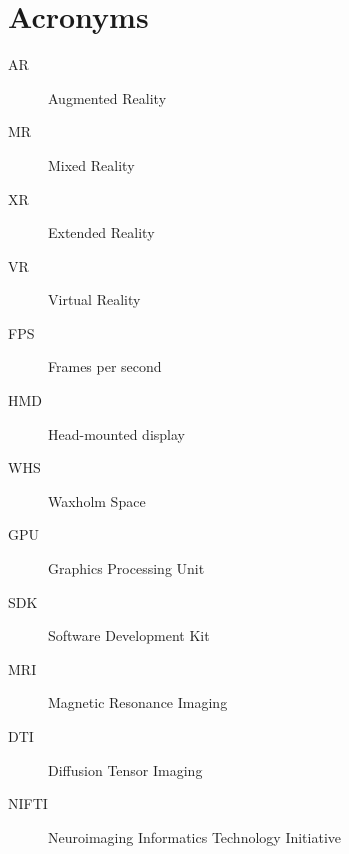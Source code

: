 
\chapter{Acronyms}
\begin{description}
\item[AR] Augmented Reality
\item[MR] Mixed Reality
\item[XR] Extended Reality
\item[VR] Virtual Reality
\item[FPS] Frames per second
\item[HMD] Head-mounted display
\item[WHS] Waxholm Space
\item[GPU] Graphics Processing Unit
\item[SDK] Software Development Kit
\item[MRI] Magnetic Resonance Imaging 
\item[DTI] Diffusion Tensor Imaging 
\item[NIFTI] Neuroimaging Informatics Technology Initiative
\end{description}